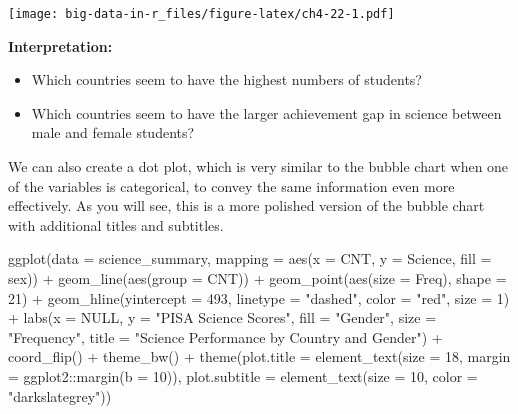 \documentclass[
]{book}
\newenvironment{Shaded}{\begin{snugshade}}{\end{snugshade}}
\newcommand{\AttributeTok}[1]{\textcolor[rgb]{0.77,0.63,0.00}{#1}}
\newcommand{\ConstantTok}[1]{\textcolor[rgb]{0.00,0.00,0.00}{#1}}
\newcommand{\DecValTok}[1]{\textcolor[rgb]{0.00,0.00,0.81}{#1}}
\newcommand{\FunctionTok}[1]{\textcolor[rgb]{0.00,0.00,0.00}{#1}}
\newcommand{\NormalTok}[1]{#1}
\newcommand{\SpecialCharTok}[1]{\textcolor[rgb]{0.00,0.00,0.00}{#1}}
\newcommand{\StringTok}[1]{\textcolor[rgb]{0.31,0.60,0.02}{#1}}
\providecommand{\tightlist}{%
  \setlength{\itemsep}{0pt}\setlength{\parskip}{0pt}}
\begin{document}
\texttt{[image: big-data-in-r\_files/figure-latex/ch4-22-1.pdf]}

\textbf{Interpretation:}

\begin{itemize}
\tightlist
\item
  Which countries seem to have the highest numbers of students?
\item
  Which countries seem to have the larger achievement gap in science between male and female students?
\end{itemize}

We can also create a dot plot, which is very similar to the bubble chart when one of the variables is categorical, to convey the same information even more effectively. As you will see, this is a more polished version of the bubble chart with additional titles and subtitles.

\begin{Shaded}
\begin{Highlighting}[]
\FunctionTok{ggplot}\NormalTok{(}\AttributeTok{data =}\NormalTok{ science\_summary, }\AttributeTok{mapping =} \FunctionTok{aes}\NormalTok{(}\AttributeTok{x =}\NormalTok{ CNT, }\AttributeTok{y =}\NormalTok{ Science, }\AttributeTok{fill =}\NormalTok{ sex)) }\SpecialCharTok{+}
    \FunctionTok{geom\_line}\NormalTok{(}\FunctionTok{aes}\NormalTok{(}\AttributeTok{group =}\NormalTok{ CNT)) }\SpecialCharTok{+} \FunctionTok{geom\_point}\NormalTok{(}\FunctionTok{aes}\NormalTok{(}\AttributeTok{size =}\NormalTok{ Freq), }\AttributeTok{shape =} \DecValTok{21}\NormalTok{) }\SpecialCharTok{+} \FunctionTok{geom\_hline}\NormalTok{(}\AttributeTok{yintercept =} \DecValTok{493}\NormalTok{,}
    \AttributeTok{linetype =} \StringTok{"dashed"}\NormalTok{, }\AttributeTok{color =} \StringTok{"red"}\NormalTok{, }\AttributeTok{size =} \DecValTok{1}\NormalTok{) }\SpecialCharTok{+} \FunctionTok{labs}\NormalTok{(}\AttributeTok{x =} \ConstantTok{NULL}\NormalTok{, }\AttributeTok{y =} \StringTok{"PISA Science Scores"}\NormalTok{,}
    \AttributeTok{fill =} \StringTok{"Gender"}\NormalTok{, }\AttributeTok{size =} \StringTok{"Frequency"}\NormalTok{, }\AttributeTok{title =} \StringTok{"Science Performance by Country and Gender"}\NormalTok{) }\SpecialCharTok{+}
    \FunctionTok{coord\_flip}\NormalTok{() }\SpecialCharTok{+} \FunctionTok{theme\_bw}\NormalTok{() }\SpecialCharTok{+} \FunctionTok{theme}\NormalTok{(}\AttributeTok{plot.title =} \FunctionTok{element\_text}\NormalTok{(}\AttributeTok{size =} \DecValTok{18}\NormalTok{, }\AttributeTok{margin =}\NormalTok{ ggplot2}\SpecialCharTok{::}\FunctionTok{margin}\NormalTok{(}\AttributeTok{b =} \DecValTok{10}\NormalTok{)),}
    \AttributeTok{plot.subtitle =} \FunctionTok{element\_text}\NormalTok{(}\AttributeTok{size =} \DecValTok{10}\NormalTok{, }\AttributeTok{color =} \StringTok{"darkslategrey"}\NormalTok{))}
\end{Highlighting}
\end{Shaded}
\end{document}
